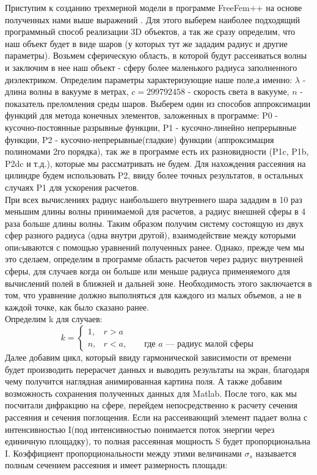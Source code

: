 Приступим к созданию трехмерной модели в программе FreeFem++ на основе полученных нами выше выражений \cite{bfreefem}.  Для этого выберем наиболее подходящий программный способ реализации 3D объектов, а так же сразу определим, что наш объект будет в виде шаров (у которых тут же зададим радиус и другие параметры). Возьмем сферическую область, в которой будут рассеиваться волны и заключим в нее наш объект - сферу более маленького радиуса заполненного диэлектриком.
Определим параметры характеризующие наше поле,а именно:
	$ \lambda$ - длина волны в вакууме в метрах,
	$ c = 299792458 $ - скорость света в вакууме, $ n$ - показатель преломления среды шаров.
Выберем один из способов аппроксимации функций для метода конечных элементов, заложенных в программе: P0 - кусочно-постоянные разрывные функции, P1 - кусочно-линейно непрерывные функции, P2 - кусочно-непрерывные(гладкие) функции (аппроксимация полиномами 2го порядка), так же в программе есть их разновидности (P1c, P1b, P2dc и т.д.), которые мы рассматривать не будем. Для нахождения рассеяния на цилиндре будем использовать P2, ввиду более точных результатов, в остальных случаях P1 для ускорения расчетов.\\
При всех вычислениях радиус наибольшего внутреннего шара зададим в 10 раз меньшим длины волны принимаемой для расчетов, а радиус внешней сферы в 4 раза больше длины волны. Таким образом получим систему состоящую из двух сфер разного радиуса (одна внутри другой), взаимодействие между которыми опиcываются с помощью уравнений полученных ранее. Однако, прежде чем мы это сделаем, определим в программе область расчетов через радиус внутренней сферы, для случаев когда он больше или меньше радиуса применяемого для вычислений полей в ближней и дальней зоне. Необходимость этого заключается в том, что уравнение должно выполняться для каждого из малых объемов, а не в каждой точке, как было сказано ранее.
\\
Определим k для случаев:
\begin{equation}
	k = 
	\begin{cases}
		1, & r > a\\
		n, & r < a ,\qquad \text{где }a \text{ --- радиус малой сферы}
	\end{cases}
\end{equation}
Далее добавим цикл, который ввиду гармонической зависимости от времени будет производить перерасчет данных и выводить результаты на экран, благодаря чему получится наглядная анимированная картина поля. А также добавим возможность сохранения полученных данных для Matlab. После того, как мы посчитали дифракцию на сфере, перейдем непосредственно к расчету сечения рассеяния и сечения поглощения. Если на рассеивающий элемент падает волна с интенсивностью I(под интенсивностью понимается поток энергии через единичную площадку), то полная рассеянная мощность S будет пропорциональна I. Коэффициент пропорциональности между этими величинами $ \sigma_s $ называется полным сечением рассеяния и имеет размерность площади:
